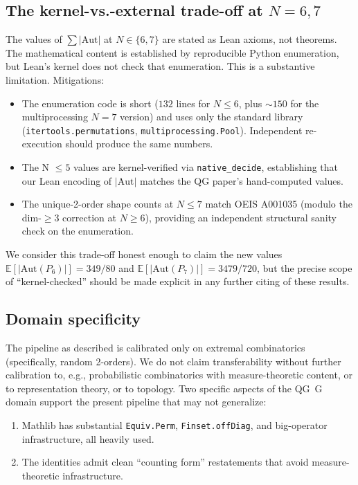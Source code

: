 \documentclass[11pt]{article}
\theoremstyle{definition}
\begin{document}
\subsection{The kernel-vs.-external trade-off at $N = 6, 7$}

The values of $\sum |\mathrm{Aut}|$ at $N \in \{6, 7\}$ are stated as Lean
axioms, not theorems. The mathematical content is established by reproducible
Python enumeration, but Lean's kernel does not check that enumeration. This is a
substantive limitation. Mitigations:

\begin{itemize}
    \item The enumeration code is short ($132$ lines for $N \le 6$, plus
    $\sim 150$ for the multiprocessing $N = 7$ version) and uses only the standard
    library (\texttt{itertools.permutations}, \texttt{multiprocessing.Pool}).
    Independent re-execution should produce the same numbers.
    \item The N $\le 5$ values are kernel-verified via \texttt{native\_decide},
    establishing that our Lean encoding of $|\mathrm{Aut}|$ matches the QG
    paper's hand-computed values.
    \item The unique-2-order shape counts at $N \le 7$ match OEIS A001035 (modulo
    the dim-$\ge 3$ correction at $N \ge 6$), providing an independent
    structural sanity check on the enumeration.
\end{itemize}

We consider this trade-off honest enough to claim the new values
$\mathbb{E}[|\mathrm{Aut}(P_6)|] = 349/80$ and
$\mathbb{E}[|\mathrm{Aut}(P_7)|] = 3479/720$, but the precise scope of
``kernel-checked'' should be made explicit in any further citing of these
results.

\subsection{Domain specificity}

The pipeline as described is calibrated only on extremal combinatorics
(specifically, random 2-orders). We do not claim transferability without
further calibration to, e.g., probabilistic combinatorics with measure-theoretic
content, or to representation theory, or to topology. Two specific aspects of
the QG~G domain support the present pipeline that may not generalize:

\begin{enumerate}
    \item Mathlib has substantial \texttt{Equiv.Perm}, \texttt{Finset.offDiag},
    and big-operator infrastructure, all heavily used.
    \item The identities admit clean ``counting form'' restatements that avoid
    measure-theoretic infrastructure.
\end{enumerate}
\end{document}
